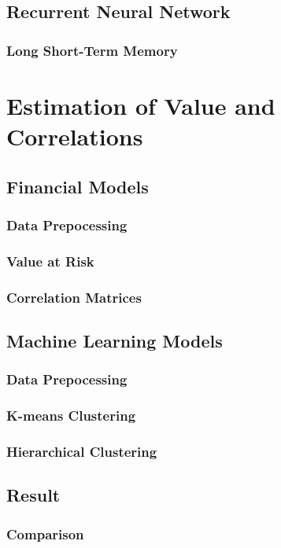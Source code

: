 \documentclass[11pt]{article} %
\theoremstyle{plain}
\theoremstyle{definition}
\begin{document}
\subsection{Recurrent Neural Network}
\subsubsection{Long Short-Term Memory}

\section{Estimation of Value and Correlations}
\subsection{Financial Models}
\subsubsection{Data Prepocessing}
\subsubsection{Value at Risk}
\subsubsection{Correlation Matrices}
\subsection{Machine Learning Models}
\subsubsection{Data Prepocessing}
\subsubsection{K-means Clustering}
\subsubsection{Hierarchical Clustering}
\subsection{Result}
\subsubsection{Comparison}
\end{document}
